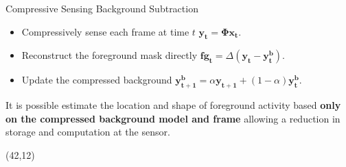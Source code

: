 \documentclass[final]{beamer}
\begin{document}
\begin{frame}{}
\begin{textblock}{36}
\begin{block}{Compressive Sensing Background Subtraction}
    \begin{itemize}
    \item Compressively sense each frame at time $t$ \hspace{9cm} \textcolor{likePurple}{$\boldsymbol{y_t} = \boldsymbol{\Phi x_t}$.}
\item Reconstruct the foreground mask directly  \hspace{5cm} \textcolor{likePurple}{${\boldsymbol{fg_t}} = \Delta (\boldsymbol{y_t} - \boldsymbol{y^b_t})$.}
\item Update the compressed background  \hspace{3cm}  \textcolor{likePurple}{$\boldsymbol{y^b_{t+1}} = \alpha \boldsymbol{y_{t+1}} + (1 - \alpha)\boldsymbol{y^b_t}$.}
    \end{itemize}


It is possible estimate the location and shape of foreground activity based \textcolor{likePurple}{\textbf{only on the compressed background model and frame}} allowing a reduction in storage and computation at the sensor.
\vspace{0.16cm}
  \end{block}
\end{textblock}





\begin{textblock}{36}(42,12)
   \begin{table}[ht!]
\centering


\end{table}
\end{textblock}
\end{frame}
\end{document}
